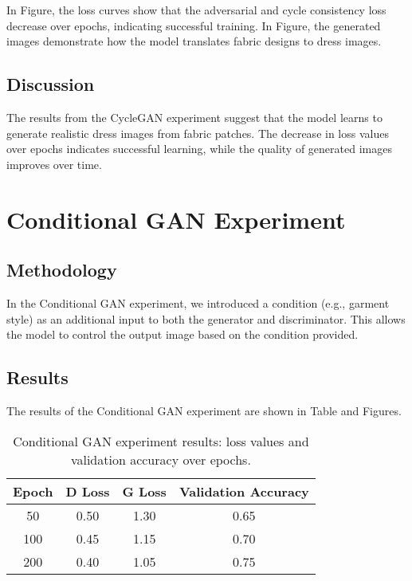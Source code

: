 \documentclass{article}
\begin{document}
In Figure, the loss curves show that the adversarial and cycle consistency loss decrease over epochs, indicating successful training. In Figure, the generated images demonstrate how the model translates fabric designs to dress images.

\subsection{Discussion}
The results from the CycleGAN experiment suggest that the model learns to generate realistic dress images from fabric patches. The decrease in loss values over epochs indicates successful learning, while the quality of generated images improves over time.

\section{Conditional GAN Experiment}

\subsection{Methodology}
In the Conditional GAN experiment, we introduced a condition (e.g., garment style) as an additional input to both the generator and discriminator. This allows the model to control the output image based on the condition provided.

\subsection{Results}
The results of the Conditional GAN experiment are shown in Table and Figures.

\begin{table}[h]
    \centering
    \begin{tabular}{cccc}
        \toprule
        \textbf{Epoch} & \textbf{D Loss} & \textbf{G Loss} & \textbf{Validation Accuracy} \\
        \midrule
        50 & 0.50 & 1.30 & 0.65 \\
        100 & 0.45 & 1.15 & 0.70 \\
        200 & 0.40 & 1.05 & 0.75 \\
        \bottomrule
    \end{tabular}
    \caption{Conditional GAN experiment results: loss values and validation accuracy over epochs.}
    \label{tab:cgan_results}
\end{table}
\end{document}
